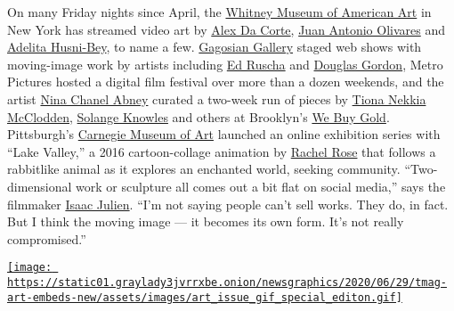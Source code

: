 On many Friday nights since April, the
\href{https://www.nytimes3xbfgragh.onion/topic/organization/whitney-museum-of-american-art}{Whitney
Museum of American Art} in New York has streamed video art by
\href{https://www.nytimes3xbfgragh.onion/2018/02/16/t-magazine/alex-da-corte-st-vincent.html}{Alex
Da Corte}, \href{https://whitney.org/artists/18064}{Juan Antonio
Olivares} and
\href{https://www.newmuseum.org/exhibitions/view/adelita-husni-bey-chiron}{Adelita
Husni-Bey}, to name a few. \href{https://gagosian.com/}{Gagosian
Gallery} staged web shows with moving-image work by artists including
\href{https://www.nytimes3xbfgragh.onion/2020/01/15/arts/design/ed-ruscha.html}{Ed
Ruscha} and \href{https://gagosian.com/artists/douglas-gordon/}{Douglas
Gordon}, Metro Pictures hosted a digital film festival over more than a
dozen weekends, and the artist
\href{https://www.nytimes3xbfgragh.onion/2018/06/13/t-magazine/artist-work-habits-camille-henrot-nina-chanel-abney.html}{Nina
Chanel Abney} curated a two-week run of pieces by
\href{https://www.nytimes3xbfgragh.onion/2019/05/09/arts/design/whitney-museum-biennial-artists.html}{Tiona
Nekkia McClodden},
\href{https://www.nytimes3xbfgragh.onion/2018/10/15/t-magazine/solange-interview.html}{Solange
Knowles} and others at Brooklyn's \href{https://webuygold.wtf/}{We Buy
Gold}. Pittsburgh's
\href{https://www.nytimes3xbfgragh.onion/2015/07/10/arts/design/carnegie-museum-to-open-a-survey-of-the-designer-peter-muller-munk.html}{Carnegie
Museum of Art} launched an online exhibition series with ``Lake
Valley,'' a 2016 cartoon-collage animation by
\href{https://www.artsy.net/artist/rachel-rose}{Rachel Rose} that
follows a rabbitlike animal as it explores an enchanted world, seeking
community. ``Two-dimensional work or sculpture all comes out a bit flat
on social media,'' says the filmmaker
\href{https://www.nytimes3xbfgragh.onion/2014/02/18/arts/international/facing-the-camera.html}{Isaac
Julien}. ``I'm not saying people can't sell works. They do, in fact. But
I think the moving image --- it becomes its own form. It's not really
compromised.''

\href{https://www.nytimes3xbfgragh.onion/issue/t-magazine/2020/07/02/true-believers-art-issue}{\texttt{[image: https://static01.graylady3jvrrxbe.onion/newsgraphics/2020/06/29/tmag-art-embeds-new/assets/images/art\_issue\_gif\_special\_editon.gif]}}

